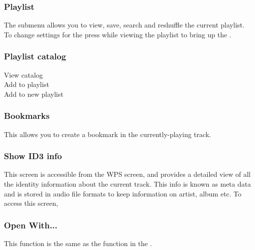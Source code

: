 \subsubsection{Playlist}
The  submenu allows you to view, save, search and
reshuffle the current playlist. To change settings for the
 press \ActionStdMenu{} while viewing the playlist
to bring up the .
    
    \subsubsection{Playlist catalog}
      \begin{description}
        \item [View catalog]
        \item [Add to playlist]
        \item [Add to new playlist]
      \end{description}
\subsubsection{Bookmarks}
This allows you to create a bookmark in the currently-playing track.

\subsubsection{\label{ref:ID3viewer}Show ID3 info}
This screen is accessible from the WPS screen, and provides a detailed view of
all the identity information about the current track. This info is known as
meta data and is stored in audio file formats to keep information on artist,
album etc. To access this screen, %
%
%
%
\subsubsection{Open With...}
This  function is the same as the  
function in the \setting{File Context Menu}.

